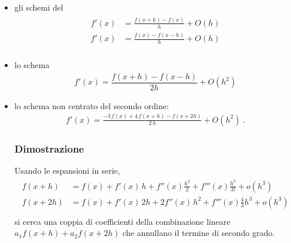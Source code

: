 \documentclass[letterpaper,10pt,italian]{jupyterBook}
\begin{document}
\begin{itemize}
\item {} 
\sphinxAtStartPar
gli schemi del 
\begin{equation*}
\begin{split}\begin{aligned}
    f'(x) & = \frac{f(x+h) - f(x)}{h} + O(h) \\
    f'(x) & = \frac{f(x) - f(x-h)}{h} + O(h) \\
  \end{aligned}\end{split}
\end{equation*}
\item {} 
\sphinxAtStartPar
lo schema 
\begin{equation*}
\begin{split}f'(x) = \dfrac{f(x+h) - f(x-h)}{2 h} + O(h^2) \end{split}
\end{equation*}
\item {} 
\sphinxAtStartPar
lo schema non centrato del secondo ordine:
\begin{equation*}
\begin{split}f'(x) = \frac{-3 \, f(x) + 4 \, f(x+h) - f(x+2h)}{2 \, h} + O(h^2) \ .\end{split}
\end{equation*}\subsubsection*{Dimostrazione}

\sphinxAtStartPar
Usando le espansioni in serie,
\begin{equation*}
\begin{split}\begin{aligned}
  f(x + h) & = f(x) + f'(x) \, h + f''(x) \frac{h^2}{2} + f'''(x) \frac{h^3}{3!} + o(h^3) \\
  f(x + 2h) & = f(x) + f'(x) \, 2 h + 2 f''(x) \, h^2 + f'''(x) \frac{4}{3} h^3 + o(h^3) \\
\end{aligned}\end{split}
\end{equation*}
\sphinxAtStartPar
si cerca una coppia di coefficienti della combinazione lineare \(a_1 f(x+h) + a_2 f(x+2h)\) che annullano il termine di secondo grado.


\end{itemize}
\end{document}
